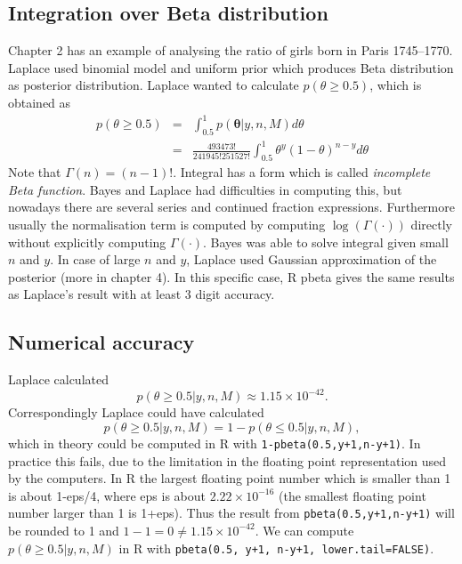 \documentclass[a4paper,11pt,english]{article}
\begin{document}
\subsection*{Integration over Beta distribution}

Chapter 2 has an example of analysing the ratio of girls born in Paris
1745--1770.  Laplace used binomial model and uniform prior which
produces Beta distribution as posterior distribution. Laplace wanted
to calculate $p(\theta \geq 0.5)$, which is obtained as
\begin{eqnarray*}
  p(\theta \geq 0.5) &=& \int_{0.5}^1  p(\mathbf{\theta}|y,n,M) d\theta \\
  &=& \frac{493473!}{241945!251527!} \int_{0.5}^1 \theta^y(1-\theta)^{n-y} d\theta
\end{eqnarray*}
Note that $\Gamma(n)=(n-1)!$.
%
Integral has a form which is called \emph{incomplete Beta function}.
Bayes and Laplace had difficulties in computing this, but nowadays
there are several series and continued fraction expressions.
%
Furthermore usually the normalisation term is computed by computing
$\log(\Gamma(\cdot))$ directly without explicitly computing
$\Gamma(\cdot)$.
%
Bayes was able to solve integral given small $n$ and $y$.
%
In case of large $n$ and $y$, Laplace used Gaussian approximation of
the posterior (more in chapter 4).
%
In this specific case, R pbeta gives the same results as Laplace's
result with at least 3 digit accuracy.

\subsection*{Numerical accuracy}

Laplace calculated
\begin{equation*}
  p(\theta \geq 0.5 | y, n, M) \approx 1.15 \times 10^{-42}.
\end{equation*}
Correspondingly Laplace could have calculated
\begin{equation*}
  p(\theta \geq 0.5 | y, n, M) = 1 - p(\theta \leq 0.5 | y, n, M),
\end{equation*}
which in theory could be computed in R with
{\tt 1-pbeta(0.5,y+1,n-y+1)}.  In practice this fails, due to the
limitation in the floating point representation used by the computers.
In R the largest floating point number which is smaller than 1 is
about 1-eps/4, where eps is about $2.22 \times 10^{-16}$ (the smallest
floating point number larger than 1 is 1+eps). Thus the result from
{\tt pbeta(0.5,y+1,n-y+1)} will be rounded to 1 and $1-1=0\neq 1.15
\times 10^{-42}$. We can compute $p(\theta \geq 0.5 | y, n, M)$ in R with {\tt pbeta(0.5, y+1, n-y+1, lower.tail=FALSE)}.
\end{document}
